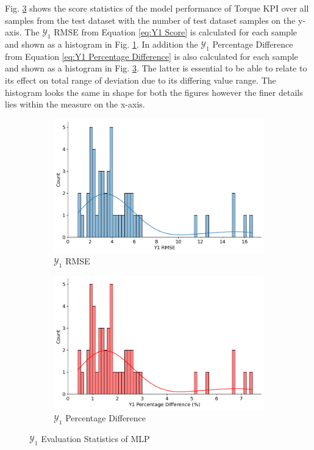 \documentclass{report} %
\begin{document}
Fig. \ref{fig:Y1 Evaluation Statistics MLP} shows the score statistics of the model performance of Torque \ac{KPI} over all samples from the test dataset 
with the number of test dataset samples on the y-axis.
The $\mathcal{Y}_1$ \ac{RMSE} from Equation \ref{eq:Y1 Score} is calculated for each sample and shown as a histogram in Fig. \ref{fig:Y1 RMSE}.
In addition the $\mathcal{Y}_1$ Percentage Difference from Equation \ref{eq:Y1 Percentage Difference} is also calculated for each sample and shown as a histogram in Fig. 
\ref{fig:Y1 Evaluation Statistics MLP}. The latter is essential to be able to relate to its effect on total range of deviation due to its differing value range. 
The histogram looks the same in shape for both the figures however the finer details lies within the measure on the x-axis.

\begin{figure}[H]
    \centering
    \begin{subfigure}{0.5\textwidth}
        \centering
        \includegraphics[width=\textwidth]{./ReportImages/score_MLP_y1.png}
        \caption{$\mathcal{Y}_1$ \ac{RMSE}}
        \label{fig:Y1 RMSE}
    \end{subfigure}\hfill
    \begin{subfigure}{0.5\textwidth}
        \centering
        \includegraphics[width=\textwidth]{./ReportImages/percentage_diff_MLP_y1.png}
        \caption{$\mathcal{Y}_1$ Percentage Difference}
        \label{fig:Y1 Percentage Difference}
    \end{subfigure}
    \caption{$\mathcal{Y}_1$ Evaluation Statistics of \ac{MLP}}
    \label{fig:Y1 Evaluation Statistics MLP}
\end{figure}
\end{document}
